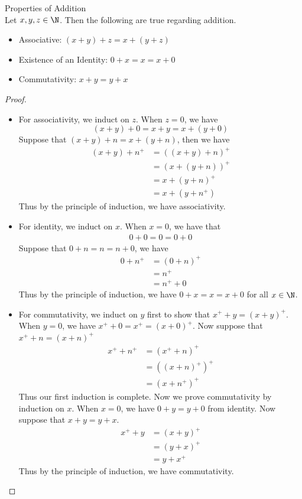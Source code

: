 \documentclass[a4paper]{article}
\begin{document}
\begin{prp}{Properties of Addition}{}\\
Let $x,y,z\in\N$. Then the following are true regarding addition. 
\begin{itemize} 
\item Associative: $(x+y)+z=x+(y+z)$
\item Existence of an Identity: $0+x=x=x+0$
\item Commutativity: $x+y=y+x$
\end{itemize}
\begin{proof}
\begin{itemize}
\item For associativity, we induct on $z$. When $z=0$, we have $$(x+y)+0=x+y=x+(y+0)$$ Suppose that $(x+y)+n=x+(y+n)$, then we have
\begin{align*}
(x+y)+n^+&=((x+y)+n)^+ \\
&=(x+(y+n))^+ \tag{Induction Hypothesis}\\
&=x+(y+n)^+ \\
&=x+(y+n^+)
\end{align*}
Thus by the principle of induction, we have associativity. 
\item For identity, we induct on $x$. When $x=0$, we have that
\begin{align*}
0+0=0=0+0
\end{align*}
Suppose that $0+n=n=n+0$, we have
\begin{align*}
0+n^+&=(0+n)^+ \\
&=n^+ \tag{Induction Hypothesis}\\
&=n^++0
\end{align*}
Thus by the principle of induction, we have $0+x=x=x+0$ for all $x\in\N$. 
\item For commutativity, we induct on $y$ first to show that $x^++y=(x+y)^+$. When $y=0$, we have $x^++0=x^+=(x+0)^+$. Now suppose that $x^++n=(x+n)^+$
\begin{align*}
x^++n^+&=(x^++n)^+ \\
&=((x+n)^+)^+ \tag{Induction Hypothesis}\\
&=(x+n^+)^+
\end{align*}
Thus our first induction is complete. Now we prove commutativity by induction on $x$. When $x=0$, we have $0+y=y+0$ from identity. Now suppose that $x+y=y+x$. 
\begin{align*}
x^++y&=(x+y)^+ \tag{First induction}\\
&=(y+x)^+ \tag{Induction Hypothesis}\\
&=y+x^+
\end{align*}
Thus by the principle of induction, we have commutativity. 
\end{itemize}
\end{proof}
\end{prp}
\end{document}
